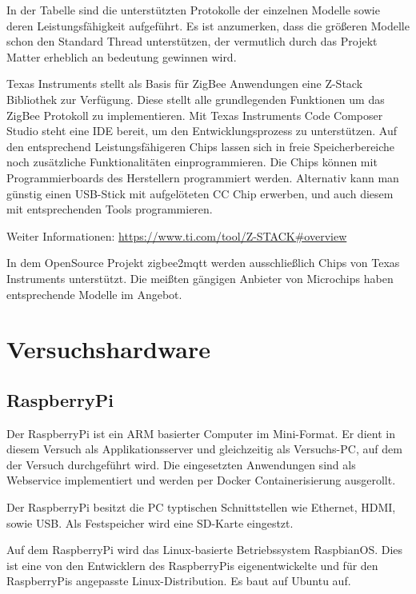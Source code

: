 In der Tabelle sind die unterstützten Protokolle der einzelnen Modelle sowie deren Leistungsfähigkeit aufgeführt.
Es ist anzumerken, dass die größeren Modelle schon den Standard Thread unterstützen, der vermutlich durch das
Projekt \grqq Matter\grqq{} erheblich an bedeutung gewinnen wird.

Texas Instruments stellt als Basis für ZigBee Anwendungen eine Z-Stack Bibliothek zur Verfügung. Diese stellt alle grundlegenden 
Funktionen um das ZigBee Protokoll zu implementieren. Mit Texas Instruments Code Composer Studio steht eine IDE bereit,
um den Entwicklungsprozess zu unterstützen. Auf den entsprechend Leistungsfähigeren Chips lassen sich in freie Speicherbereiche noch zusätzliche
Funktionalitäten einprogrammieren. Die Chips können mit Programmierboards des Herstellern programmiert werden. Alternativ kann man
günstig einen USB-Stick mit aufgelöteten CC Chip erwerben, und auch diesem mit entsprechenden Tools programmieren.

Weiter Informationen: \url{https://www.ti.com/tool/Z-STACK#overview}

In dem OpenSource Projekt \grqq zigbee2mqtt \grqq{} werden ausschließlich Chips von Texas Instruments unterstützt. Die meißten gängigen Anbieter von Microchips 
haben entsprechende Modelle im Angebot. 

\section{Versuchshardware}

\subsection{RaspberryPi}

Der RaspberryPi ist ein ARM basierter Computer im Mini-Format. Er dient in diesem Versuch als Applikationsserver und gleichzeitig als Versuchs-PC, 
auf dem der Versuch durchgeführt wird. Die eingesetzten Anwendungen sind 
als Webservice implementiert und werden per Docker Containerisierung ausgerollt.

Der RaspberryPi besitzt die PC typtischen Schnittstellen wie Ethernet, HDMI, sowie USB. Als Festspeicher wird eine
SD-Karte eingestzt. 

Auf dem RaspberryPi wird das Linux-basierte Betriebssystem RaspbianOS. Dies ist eine von den Entwicklern des RaspberryPis eigenentwickelte und für den RaspberryPis
angepasste Linux-Distribution. Es baut auf Ubuntu auf.

